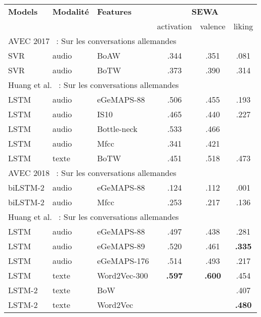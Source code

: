 \begin{table}[]
    \centering
    \begin{tabular}{| l | l | l | c | c | c |}
        \hline
        \textbf{Models} &\textbf{Modalité} &\textbf{Features} &\multicolumn{3}{c|}{\textbf{SEWA}} \\ \cline{3-6}
        & & &activation &valence &liking \\
        \hline
        \multicolumn{6}{|l|}{AVEC 2017~\cite{AVEC2017} : Sur les conversations allemandes} \\
        \hline
        SVR      &audio &BoAW~\cite{Schmitt2016} &.344  &.351 &.081 \\
        SVR      &audio &BoTW                    &.373  &.390 &.314 \\
       \hline
       \multicolumn{6}{|l|}{Huang et al.~\cite{Huang2017} : Sur les conversations allemandes} \\
       \hline
       LSTM     &audio &eGeMAPS-88  &.506  &.455 &.193 \\
       LSTM     &audio &IS10        &.465  &.440 &.227 \\
       LSTM     &audio &Bottle-neck~\cite{Fer2015} &.533  &.466 &     \\
       LSTM     &audio &Mfcc        &.341  &.421 &     \\
       LSTM     &texte &BoTW        &.451  &.518 &.473 \\
        \hline
        \multicolumn{6}{|l|}{AVEC 2018~\cite{AVEC2018} : Sur les conversations allemandes} \\
        \hline
        biLSTM-2 &audio &eGeMAPS-88  &.124  &.112 &.001 \\
        biLSTM-2 &audio &Mfcc        &.253  &.217 &.136 \\
         \hline
       \multicolumn{6}{|l|}{Huang et al.~\cite{Huang2018} : Sur les conversations allemandes} \\
       \hline
       LSTM     &audio &eGeMAPS-88   &.497  &.438 &.281 \\
       LSTM     &audio &eGeMAPS-89   &.520  &.461 &\textbf{.335} \\
       LSTM     &audio &eGeMAPS-176  &.514  &.493 &.217 \\
       LSTM       &texte &Word2Vec-300   &\textbf{.597}  &\textbf{.600} &.454 \\
       LSTM-2     &texte &BoW            &  & &.407 \\
       LSTM-2     &texte &Word2Vec       &  & &\textbf{.480} \\

\end{tabular}
\end{table}

